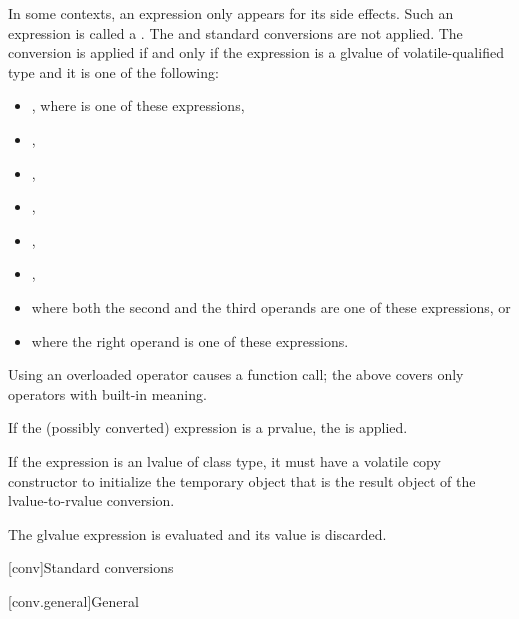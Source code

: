 \pnum
In some contexts, an expression only appears for its side effects. Such an
expression is called a .
The 
and  standard conversions are not
applied. The  conversion is applied
if and only if
the expression is a glvalue of volatile-qualified type and it is one of the
following:
\begin{itemize}
\item \tcode{(}  \tcode{)}, where
 is one of these expressions,
\item {},
\item {},
\item {},
\item {},
\item {},
\item {} where both the second and the
  third operands are one of these expressions, or
\item {} where the right operand is one of
  these expressions.
\end{itemize}

\begin{note}
Using an overloaded operator causes a function call; the
above covers only operators with built-in meaning.
\end{note}
If the (possibly converted) expression is a prvalue,
the  is applied.
\begin{note}
If the expression is an lvalue of
class type, it must have a volatile copy constructor to initialize the
temporary object that is the result object of the lvalue-to-rvalue
conversion.
\end{note}
The glvalue expression is evaluated and its value is discarded.

[conv]{Standard conversions}

[conv.general]{General}

%

